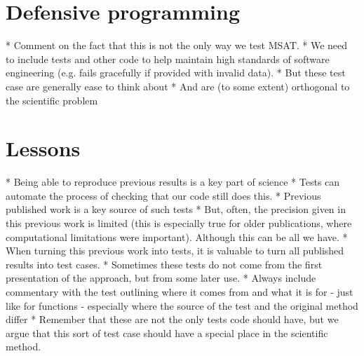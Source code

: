 \documentclass[11pt, oneside]{article}   	%
\begin{document}
\section{Defensive programming}

* Comment on the fact that this is not the only way we test MSAT.
* We need to include tests and other code to help maintain high 
standards of software engineering (e.g. fails gracefully if provided 
with invalid data).
* But these test case are generally ease to think about
* And are (to some extent) orthogonal to the scientific problem

\section{Lessons}

* Being able to reproduce previous results is a key part of science
* Tests can automate the process of checking that our code still does 
this.
* Previous published work is a key source of such tests
* But, often, the precision given in this previous work is limited (this
is especially true for older publications, where computational limitations 
were important). Although this can be all we have.
* When turning this previous work into tests, it is valuable to turn all
published results into test cases.
* Sometimes these tests do not come from the first presentation of the 
approach, but from some later use.
* Always include commentary with the test outlining where it comes from
and what it is for - just like for functions - especially where the source of the 
test and the original method differ
* Remember that these are not the only tests code should have, but we
argue that this sort of test case should have a special place in the scientific
method.


 
\end{document}
